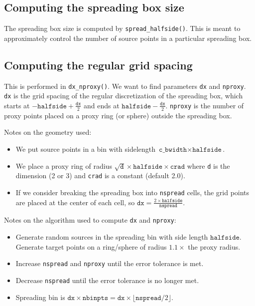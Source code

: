\documentclass[11pt]{article}
\newcommand{\halfside}{\texttt{halfside}}
\begin{document}
\subsection{Computing the spreading box size}
The spreading box size is computed by \texttt{spread\_halfside()}. This is meant to approximately control the number of source points in a particular spreading box.

\subsection{Computing the regular grid spacing}
This is performed in \texttt{dx\_nproxy()}.
We want to find parameters \texttt{dx} and \texttt{nproxy}. \texttt{dx} is the grid spacing of the regular discretization of the spreading box, which starts at $-\halfside + \frac{\texttt{dx}}{2}$ and ends at $\halfside - \frac{\texttt{dx}}{2}$. \texttt{nproxy} is the number of proxy points placed on a proxy ring (or sphere) outside the spreading box.

Notes on the geometry used:
\begin{itemize}
    \item We put source points in a bin with sidelength $\texttt{c\_bwidth}  \times \halfside$.
    \item We place a proxy ring of radius $\sqrt{\texttt{d}} \times \halfside \times \texttt{crad}$ where \texttt{d} is the dimension (2 or 3) and \texttt{crad} is a constant (default 2.0).
    \item If we consider breaking the spreading box into \texttt{nspread} cells, the grid points are placed at the center of each cell, so $\texttt{dx} = \frac{2 \times \halfside}{\texttt{nspread}}$.
\end{itemize}


Notes on the algorithm used to compute \texttt{dx} and \texttt{nproxy}:
\begin{itemize}
  \item Generate random sources in the spreading bin with side length $\halfside$. Generate target points on a ring/sphere of radius $1.1 \times$ the proxy radius.
  \item Increase \texttt{nspread} and \texttt{nproxy} until the error tolerance is met.
  \item Decrease \texttt{nspread} until the error tolerance is no longer met.
  \item Spreading bin is $\texttt{dx} \times \texttt{nbinpts} = \texttt{dx} \times \lfloor \texttt{nspread}/2 \rfloor$.
\end{itemize}
\end{document}
